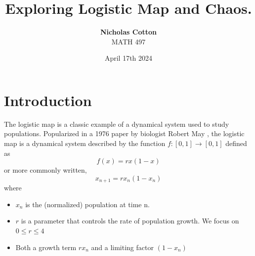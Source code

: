 \documentclass[11pt,twocolumn]{article}
\begin{document}
\title{\bf \Huge Exploring Logistic Map and Chaos.}
\author{{\bf \Large Nicholas Cotton}\\
  MATH 497
  }
\date{April 17th 2024}


\let\leqslant=\leq

\label{firstpage}




\maketitle

\pagestyle{fancy}


\section{Introduction}

The logistic map is a classic example of a dynamical system used to study populations. Popularized in a 1976 paper by biologist Robert May\cite{May1976}
, the logistic map is a dynamical system described by the function $f:[0,1]\to[0,1]$ defined as
\[f(x)=rx(1-x)\]
or more commonly written,
\begin{equation}
x_{n+1} = rx_n(1-x_n) \label{eqn:equation1}
\end{equation}
where
\begin{itemize}
    \item $x_n$ is the (normalized) population at time n. 
    \item $r$ is a parameter that controls the rate of population growth. We focus on $0\leq r\leq 4$
    \item Both a growth term $rx_n$ and a limiting factor $(1-x_n)$
\end{itemize}
\end{document}
